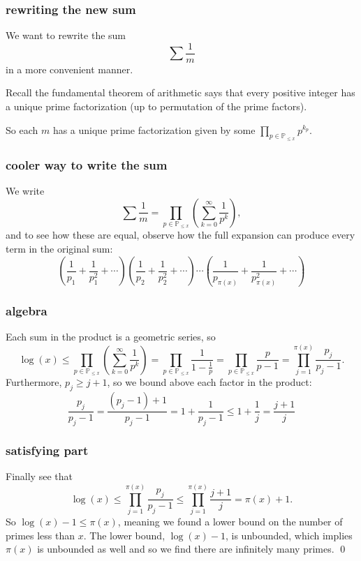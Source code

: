 \documentclass[mathserif]{beamer}
\newcommand{\br}[1]{\left(#1\right)}
\begin{document}
\begin{frame}
  \frametitle{rewriting the new sum}
  We want to rewrite the sum \[\sum\frac{1}{m}\] in a more convenient manner.
  
  Recall the fundamental theorem of arithmetic says that every positive integer has a unique prime factorization (up to permutation of the prime factors).

  So each $m$ has a unique prime factorization given by some $\displaystyle{\prod_{p\in \mathbb{P}_{\leq x}} p^{k_p}}$.
\end{frame}

\begin{frame}
  \frametitle{cooler way to write the sum}
  We write \[\sum \frac{1}{m} = \prod_{p\in \mathbb{P}_{\leq x}}\br{\sum_{k=0}^{\infty} \frac{1}{p^k}},\] and to see how these are equal, observe how the full expansion can produce every term in the original sum: \[\br{\frac{1}{p_1}+\frac{1}{p_1^2}+\cdots}\br{\frac{1}{p_2}+\frac{1}{p_2^2}+\cdots}\cdots\br{\frac{1}{p_{\pi(x)}}+\frac{1}{p_{\pi(x)}^2}+\cdots}\]
\end{frame}

\begin{frame}
  \frametitle{algebra}
  Each sum in the product is a geometric series, so
  \[\log(x)\leq \prod_{p\in \mathbb{P}_{\leq x}}\br{\sum_{k=0}^{\infty} \frac{1}{p^k}} = \prod_{p\in \mathbb{P}_{\leq x}}\frac{1}{1-\frac{1}{p}} = \prod_{p\in \mathbb{P}_{\leq x}}\frac{p}{p-1} = \prod_{j = 1}^{\pi(x)}\frac{p_j}{p_j-1}.\] Furthermore, $p_j \geq j+1$, so we bound above each factor in the product: \[\frac{p_j}{p_j-1} = \frac{(p_j-1) + 1}{p_j-1} = 1 + \frac{1}{p_j-1} \leq 1+\frac{1}{j} = \frac{j+1}{j}\]
\end{frame}

\begin{frame}
  \frametitle{satisfying part}
  Finally see that \[\log(x) \leq \prod_{j = 1}^{\pi(x)}\frac{p_j}{p_j-1} \leq \prod_{j=1}^{\pi(x)}\frac{j+1}{j} = \pi(x)+1.\] So $\log(x)-1 \leq \pi(x)$, meaning we found a lower bound on the number of primes less than $x$. The lower bound, $\log(x)-1$, is unbounded, which implies $\pi(x)$ is unbounded as well and so we find there are infinitely many primes. \qed
\end{frame}
\end{document}
